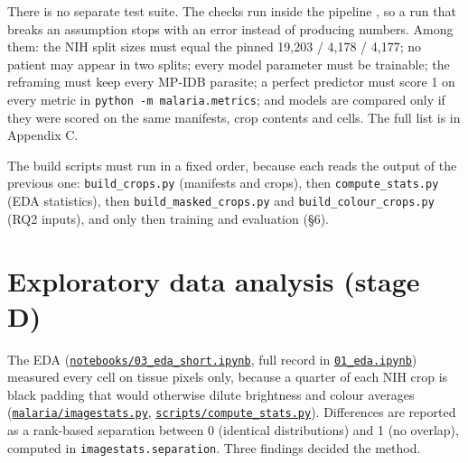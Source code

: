 \documentclass[11pt,a4paper]{article}
\begin{document}
There is no separate test suite. The checks run inside the pipeline \citep{beaulieujones2017}, so a run that breaks an assumption stops with an error instead of producing numbers. Among them: the NIH split sizes must equal the pinned 19,203 / 4,178 / 4,177; no patient may appear in two splits; every model parameter must be trainable; the reframing must keep every MP-IDB parasite; a perfect predictor must score 1 on every metric in \texttt{python -m malaria.\allowbreak{}metrics}; and models are compared only if they were scored on the same manifests, crop contents and cells. The full list is in Appendix C.

The build scripts must run in a fixed order, because each reads the output of the previous one: \texttt{build\_\allowbreak{}crops.\allowbreak{}py} (manifests and crops), then \texttt{compute\_\allowbreak{}stats.\allowbreak{}py} (EDA statistics), then \texttt{build\_\allowbreak{}masked\_\allowbreak{}crops.\allowbreak{}py} and \texttt{build\_\allowbreak{}colour\_\allowbreak{}crops.\allowbreak{}py} (RQ2 inputs), and only then training and evaluation (\S{}6).

\section{Exploratory data analysis (stage D)}

The EDA (\href{https://github.com/noahtjonsk/malaria-cross-dataset/blob/main/notebooks/03_eda_short.ipynb}{\texttt{notebooks/\allowbreak{}03\_\allowbreak{}eda\_\allowbreak{}short.\allowbreak{}ipynb}}, full record in \href{https://github.com/noahtjonsk/malaria-cross-dataset/blob/main/notebooks/01_eda.ipynb}{\texttt{01\_\allowbreak{}eda.\allowbreak{}ipynb}}) measured every cell on tissue pixels only, because a quarter of each NIH crop is black padding that would otherwise dilute brightness and colour averages (\href{https://github.com/noahtjonsk/malaria-cross-dataset/blob/main/malaria/imagestats.py}{\texttt{malaria/\allowbreak{}imagestats.\allowbreak{}py}}, \href{https://github.com/noahtjonsk/malaria-cross-dataset/blob/main/scripts/compute_stats.py}{\texttt{scripts/\allowbreak{}compute\_\allowbreak{}stats.\allowbreak{}py}}). Differences are reported as a rank-based separation between 0 (identical distributions) and 1 (no overlap), computed in \texttt{imagestats.\allowbreak{}separation}. Three findings decided the method.
\end{document}
